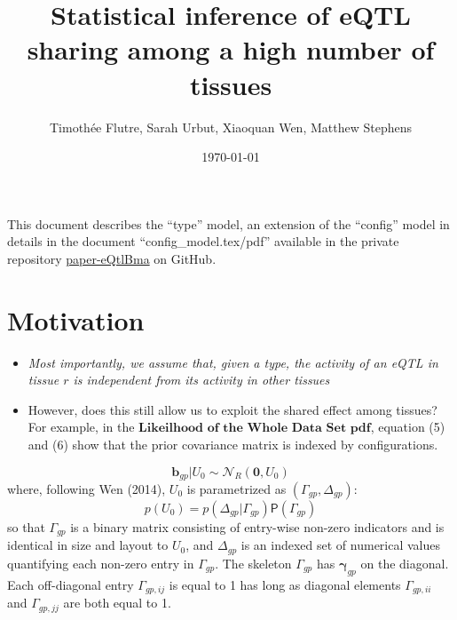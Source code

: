 \documentclass[10pt]{article}
\newcommand{\Prd}{\mathsf{P}} %
\newcommand{\Norm}{{\mathcal{N}}} %
\begin{document}
\title{Statistical inference of eQTL sharing among a high number of tissues}
\author{Timoth\'{e}e Flutre, Sarah Urbut, Xiaoquan Wen, Matthew Stephens}
\date{\today}

\maketitle


\vspace{1cm}

This document describes the ``type'' model, an extension of the ``config'' model in details in the document ``config\_model.tex/pdf'' available in the private repository \href{https://github.com/stephenslab/paper-eQtlBma}{paper-eQtlBma} on GitHub.



\section{Motivation}

\begin{itemize}
\item \emph{Most importantly, we assume that, given a type, the activity of an eQTL in tissue $r$ is independent from its activity in other tissues}

\item However, does this still allow us to exploit the shared effect among tissues? For example, in the $\textbf{Likeilhood of the Whole Data Set pdf}$, equation (5) and (6) show that the prior covariance matrix is indexed by configurations.
\end{itemize}

\begin{equation}
  \bm{b}_{gp} | U_{0} \sim \Norm_R(\bm{0}, U_{0})
\end{equation}
where, following Wen (2014), $U_{0}$ is parametrized as $(\Gamma_{gp},\Delta_{gp})$:
\begin{equation}
  p(U_{0}) = p(\Delta_{gp} | \Gamma_{gp}) \Prd(\Gamma_{gp})
\end{equation}
so that $\Gamma_{gp}$ is a binary matrix consisting of entry-wise non-zero indicators and is identical in size and layout to $U_{0}$, and $\Delta_{gp}$ is an indexed set of numerical values quantifying each non-zero entry in $\Gamma_{gp}$.
The skeleton $\Gamma_{gp}$ has $\bm{\gamma}_{gp}$ on the diagonal. Each off-diagonal entry $\Gamma_{gp,ij}$ is equal to 1 has long as diagonal elements $\Gamma_{gp,ii}$ and $\Gamma_{gp,jj}$ are both equal to 1.
\end{document}
